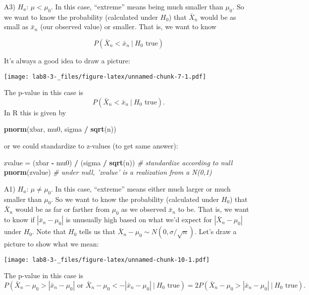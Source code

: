 \documentclass[]{article}
\newenvironment{Shaded}{\begin{snugshade}}{\end{snugshade}}
\newcommand{\CommentTok}[1]{\textcolor[rgb]{0.56,0.35,0.01}{\textit{#1}}}
\newcommand{\KeywordTok}[1]{\textcolor[rgb]{0.13,0.29,0.53}{\textbf{#1}}}
\newcommand{\NormalTok}[1]{#1}
\newcommand{\OperatorTok}[1]{\textcolor[rgb]{0.81,0.36,0.00}{\textbf{#1}}}
\newcommand{\StringTok}[1]{\textcolor[rgb]{0.31,0.60,0.02}{#1}}
\begin{document}
A3) \(H_{a}\): \(\mu < \mu_0\). In this case, ``extreme'' means being
much smaller than \(\mu_0\). So we want to know the probability
(calculated under \(H_0\)) that \(\bar X_n\) would be as small as
\(\bar x_n\) (our observed value) or smaller. That is, we want to know

\[
P(\bar X_n < \bar x_n~|~H_0\text{ true})
\]

It's always a good idea to draw a picture:

\texttt{[image: lab8-3-\_files/figure-latex/unnamed-chunk-7-1.pdf]}

The p-value in this case is \[
P(\bar X_n < \bar x_n~|~H_0\text{ true}).
\] In R this is given by

\begin{Shaded}
\begin{Highlighting}[]
\KeywordTok{pnorm}\NormalTok{(xbar, mu0, sigma }\OperatorTok{/}\StringTok{ }\KeywordTok{sqrt}\NormalTok{(n))}
\end{Highlighting}
\end{Shaded}

or we could standardize to z-values (to get same answer):

\begin{Shaded}
\begin{Highlighting}[]
\NormalTok{zvalue =}\StringTok{ }\NormalTok{(xbar }\OperatorTok{-}\StringTok{ }\NormalTok{mu0) }\OperatorTok{/}\StringTok{ }\NormalTok{(sigma }\OperatorTok{/}\StringTok{ }\KeywordTok{sqrt}\NormalTok{(n)) }\CommentTok{# standardize according to null}
\KeywordTok{pnorm}\NormalTok{(zvalue) }\CommentTok{# under null, 'zvalue' is a realization from a N(0,1)}
\end{Highlighting}
\end{Shaded}

A1) \(H_{a}\): \(\mu \neq \mu_0\). In this case, ``extreme'' means
either much larger or much smaller than \(\mu_0\). So we want to know
the probability (calculated under \(H_0\)) that \(\bar X_n\) would be as
far or farther from \(\mu_0\) as we observed \(\bar x_n\) to be. That
is, we want to know if \(|\bar x_n-\mu_0|\) is unusually high based on
what we'd expect for \(|\bar X_n-\mu_0|\) under \(H_0\). Note that
\(H_0\) tells us that \(\bar X_n-\mu_0\sim N(0,\sigma/\sqrt{n})\). Let's
draw a picture to show what we mean:

\texttt{[image: lab8-3-\_files/figure-latex/unnamed-chunk-10-1.pdf]}

The p-value in this case is \[
P(\bar X_n-\mu_0 > |\bar x_n-\mu_0|\text{ or }\bar X_n-\mu_0 < -|\bar x_n-\mu_0|~|~H_0\text{ true}) = 2P(\bar X_n-\mu_0 > |\bar x_n-\mu_0|~|~H_0\text{ true}).
\]
\end{document}
